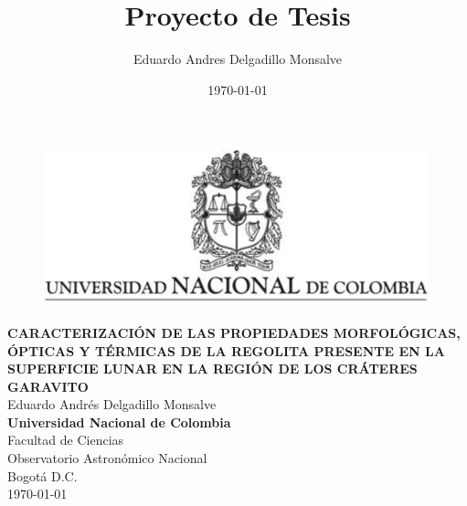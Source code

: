 \documentclass[12pt]{article}
\title{Proyecto de Tesis}
\author{Eduardo Andres Delgadillo Monsalve}
\date{\today}
\begin{document}
\renewcommand{\tablename}{Tabla}%
\renewcommand{\listtablename}{Índice de tablas}
\begin{titlepage}
    \centering
    \thispagestyle{empty}
    \begin{center}
        \begin{figure}
        \centering%
        \includegraphics{images/EscudoUN.png}
    \end{figure}
    
    \vspace{3cm}
    
    \textbf{CARACTERIZACIÓN DE LAS PROPIEDADES MORFOLÓGICAS, ÓPTICAS Y 
    TÉRMICAS DE LA REGOLITA PRESENTE EN LA SUPERFICIE LUNAR EN LA REGIÓN 
    DE LOS CRÁTERES GARAVITO}\\[1in]    
    Eduardo Andrés Delgadillo Monsalve \\  [3in]

   \textbf{Universidad Nacional de Colombia}\\
   Facultad de Ciencias\\
   Observatorio Astronómico Nacional\\
   Bogotá D.C.\\
   \today
    \end{center}
\end{titlepage}
\end{document}
